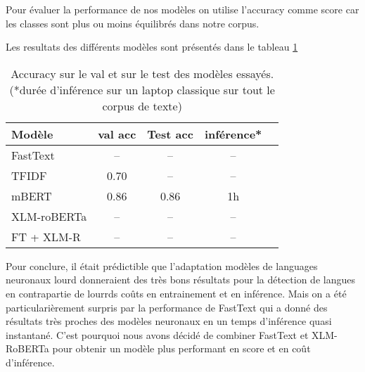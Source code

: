 
Pour évaluer la performance de nos modèles on utilise l'accuracy comme score car les classes sont plus ou moins équilibrés dans notre corpus.

Les resultats des différents modèles sont présentés dans le tableau \ref{tab:results}

\begin{table}[ht]
    \centering
    \begin{tabular}{lcccc}
        \toprule
        Modèle & val acc & Test acc  & inférence* \\
        \midrule
        FastText & -- & -- & -- \\
        TFIDF & 0.70 & -- & -- \\
        mBERT & 0.86 & 0.86 & 1h \\
        XLM-roBERTa & -- & -- & -- \\
        FT + XLM-R & -- & -- & -- \\
        \bottomrule
    \end{tabular}

    \caption{Accuracy sur le val et sur le test des modèles essayés. (*durée d'inférence sur un laptop classique sur tout le corpus de texte)}
    
    \label{tab:results}
\end{table}

Pour conclure, il était prédictible que l'adaptation modèles de languages neuronaux lourd donneraient des très bons résultats pour la détection de langues en contrapartie de lourrds coûts en entrainement et en inférence. Mais on a été particularièrement surpris par la performance de FastText qui a donné des résultats très proches des modèles neuronaux en un temps d'inférence quasi instantané. C'est pourquoi nous avons décidé de combiner FastText et XLM-RoBERTa pour obtenir un modèle plus performant en score et en coût d'inférence.